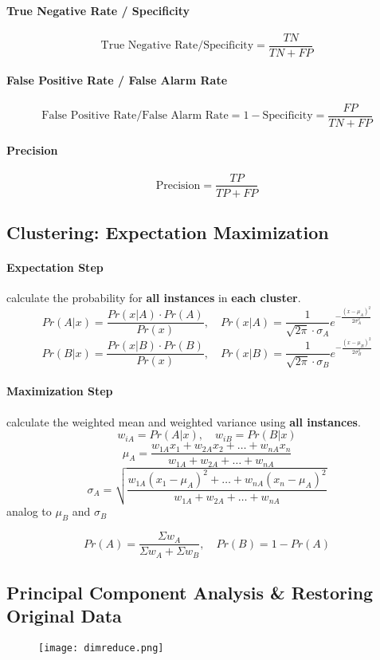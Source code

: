 \paragraph{True Negative Rate / Specificity} $$\text{True Negative Rate/Specificity} = \frac{TN}{TN + FP}$$
\paragraph{False Positive Rate / False Alarm Rate} $$\text{False Positive Rate/False Alarm Rate} = 1- \text{Specificity} = \frac{FP}{TN + FP}$$

\paragraph{Precision} $$\text{Precision} = \frac{TP}{TP + FP}$$

\subsection{Clustering: Expectation Maximization}
\paragraph{Expectation Step} calculate the probability for \textbf{all instances} in \textbf{each cluster}.
$$Pr(A|x) = \frac{Pr(x|A) \cdot Pr(A)}{Pr(x)} ,\quad Pr(x|A) = \frac{1}{\sqrt{2\pi} \cdot \sigma_A} e^{-\frac{(x - \mu_A)^2}{2\sigma_A^2}}$$
$$Pr(B|x) = \frac{Pr(x|B) \cdot Pr(B)}{Pr(x)} ,\quad Pr(x|B) = \frac{1}{\sqrt{2\pi} \cdot \sigma_B} e^{-\frac{(x - \mu_B)^2}{2\sigma_B^2}}$$

\paragraph{Maximization Step} calculate the weighted mean and weighted variance using \textbf{all instances}. 
$$w_{iA} = Pr(A|x), \quad  w_{iB} = Pr(B|x)$$
$$\mu_A = \frac{w_{1A}x_1 + w_{2A}x_2 + \dots + w_{nA}x_n}{w_{1A} + w_{2A} + \dots + w_{nA}}$$
$$\sigma_A = \sqrt{\frac{w_{1A} (x_1 - \mu_A)^2 + \dots + w_{nA} (x_n - \mu_A)^2}{w_{1A} + w_{2A} + \dots + w_{nA}}}$$
analog to $\mu_B$ and $\sigma_B$

$$Pr(A) = \frac{\Sigma w_A}{\Sigma w_A + \Sigma w_B}, \quad Pr(B) = 1 - Pr(A)$$

\subsection{Principal Component Analysis \& Restoring Original Data}
\begin{figure}[H]
	\centering
	\texttt{[image: dimreduce.png]}
\end{figure}
\newpage
